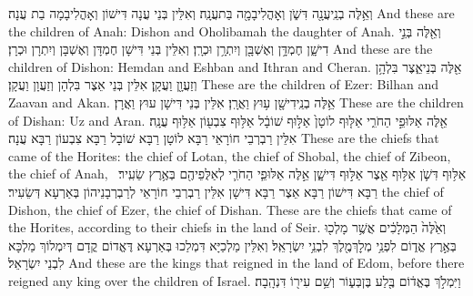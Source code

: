 {וְאֵ֥לֶּה בְנֵֽי\maqqaf עֲנָ֖ה דִּשֹׁ֑ן וְאׇהֳלִיבָמָ֖ה בַּת\maqqaf עֲנָֽה׃}
{וְאִלֵּין בְּנֵי עֲנָה דִּישׁוֹן וְאָהֳלִיבָמָה בַת עֲנָה׃}
{And these are the children of Anah: Dishon and Oholibamah the daughter of Anah.}{}
{וְאֵ֖לֶּה בְּנֵ֣י דִישָׁ֑ן חֶמְדָּ֥ן וְאֶשְׁבָּ֖ן וְיִתְרָ֥ן וּכְרָֽן׃}
{וְאִלֵּין בְּנֵי דִּישָׁן חֶמְדָּן וְאֶשְׁבָּן וְיִתְרָן וּכְרָן׃}
{And these are the children of Dishon: Hemdan and Eshban and Ithran and Cheran.}{}
{אֵ֖לֶּה בְּנֵי\maqqaf אֵ֑צֶר בִּלְהָ֥ן וְזַעֲוָ֖ן וַעֲקָֽן׃}
{אִלֵּין בְּנֵי אֵצֶר בִּלְהָן וְזַעֲוָן וַעֲקָן׃}
{These are the children of Ezer: Bilhan and Zaavan and Akan.}{}
{אֵ֥לֶּה בְנֵֽי\maqqaf דִישָׁ֖ן ע֥וּץ וַאֲרָֽן׃}
{אִלֵּין בְּנֵי דִּישָׁן עוּץ וַאֲרָן׃}
{These are the children of Dishan: Uz and Aran.}{}
{אֵ֖לֶּה אַלּוּפֵ֣י הַחֹרִ֑י אַלּ֤וּף לוֹטָן֙ אַלּ֣וּף שׁוֹבָ֔ל אַלּ֥וּף צִבְע֖וֹן אַלּ֥וּף עֲנָֽה׃}
{אִלֵּין רַבְרְבֵי חוֹרָאֵי רַבָּא לוֹטָן רַבָּא שׁוֹבָל רַבָּא צִבְעוֹן רַבָּא עֲנָה׃}
{These are the chiefs that came of the Horites: the chief of Lotan, the chief of Shobal, the chief of Zibeon, the chief of Anah,}{}
{אַלּ֥וּף דִּשֹׁ֛ן אַלּ֥וּף אֵ֖צֶר אַלּ֣וּף דִּישָׁ֑ן אֵ֣לֶּה אַלּוּפֵ֧י הַחֹרִ֛י לְאַלֻּפֵיהֶ֖ם בְּאֶ֥רֶץ שֵׂעִֽיר׃ \petucha }
{רַבָּא דִּישׁוֹן רַבָּא אֵצֶר רַבָּא דִּישָׁן אִלֵּין רַבְרְבֵי חוֹרָאֵי לְרַבְרְבָנֵיהוֹן בְּאַרְעָא דְּשֵׂעִיר׃}
{the chief of Dishon, the chief of Ezer, the chief of Dishan. These are the chiefs that came of the Horites, according to their chiefs in the land of Seir.}{}
{וְאֵ֙לֶּה֙ הַמְּלָכִ֔ים אֲשֶׁ֥ר מָלְכ֖וּ בְּאֶ֣רֶץ אֱד֑וֹם לִפְנֵ֥י מְלׇךְ\maqqaf מֶ֖לֶךְ לִבְנֵ֥י יִשְׂרָאֵֽל׃}
{וְאִלֵּין מַלְכַיָּא דִּמְלַכוּ בְּאַרְעָא דֶּאֱדוֹם קֳדָם דְּיִמְלוֹךְ מַלְכָּא לִבְנֵי יִשְׂרָאֵל׃}
{And these are the kings that reigned in the land of Edom, before there reigned any king over the children of Israel.}{}
{וַיִּמְלֹ֣ךְ בֶּאֱד֔וֹם בֶּ֖לַע בֶּן\maqqaf בְּע֑וֹר וְשֵׁ֥ם עִיר֖וֹ דִּנְהָֽבָה׃}
